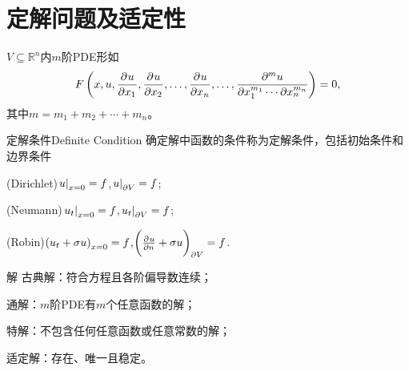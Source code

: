 \section{定解问题及适定性}
$V\subseteq\mathbb R^n$内$m$阶PDE形如
\[
	F\left(x,u,\frac{\partial^{{}}u}{\partial{x_1}^{{}}},\frac{\partial^{{}}u}{\partial{x_2}^{{}}},\ldots,\frac{\partial^{{}}u}{\partial{x_n}^{{}}},\ldots,\frac{\partial^mu}{\partial x_1^{m_1}\cdots\partial x_n^{m_n}}\right)=0,
\]
其中$m=m_1+m_2+\cdots+m_n$。
\begin{definition}{定解条件}{Definite Condition}
	确定解中函数的条件称为定解条件，包括初始条件和边界条件
	\begin{compactenum}[I.]
		\item (Dirichlet)\quad$\left.u\right\rvert_{x=0}=f$,\qqqquad$\left.u\right\rvert_{\partial V}=f$;
		\item (Neumann)\enspace$\left.u_t\right\rvert_{x=0}=f$,\qqqquad\!$\left.u_t\right\rvert_{\partial V}=f$;
		\item (Robin)\qquad$\left(u_t+\sigma u\right)_{x=0}=f$,\quad$\biggl(\frac{\partial^{{}}u}{\partial{n}^{{}}}+\sigma u\biggr)_{\partial V}=f$.
	\end{compactenum}
\end{definition}
\begin{definition}{解}{}
	古典解：符合方程且各阶偏导数连续；

	通解：$m$阶PDE有$m$个任意函数的解；

	特解：不包含任何任意函数或任意常数的解；

	适定解：存在、唯一且稳定。
\end{definition}
